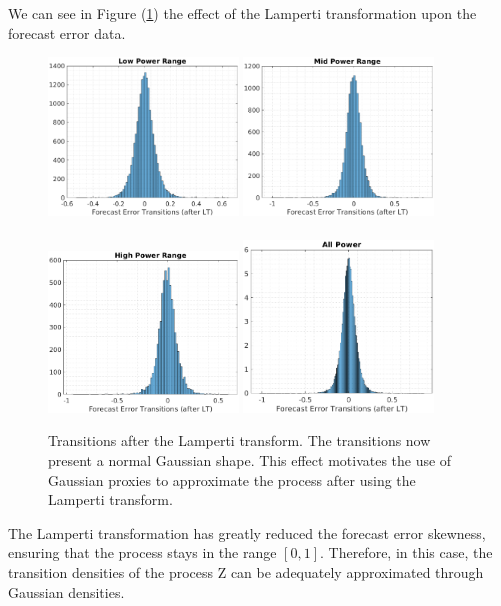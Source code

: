 \documentclass[11pt]{article}
\theoremstyle{definition}
\begin{document}
{\color{red} We can see in Figure (\ref{fig:LP_transitions}) the effect of the Lamperti transformation upon the forecast error data. 

\begin{figure}[H]
\centering
\includegraphics[width=0.45\textwidth]{plots/LP_t_LP.eps}
\includegraphics[width=0.45\textwidth]{plots/MP_t_LP.eps}\\
\quad\\
\includegraphics[width=0.45\textwidth]{plots/HP_t_LP.eps}
\includegraphics[width=0.45\textwidth]{plots/AP_t_LP.eps}
\caption{Transitions after the Lamperti transform. The transitions now present a normal Gaussian shape. This effect motivates the use of Gaussian proxies to approximate the process after using the Lamperti transform.}
  \label{fig:LP_transitions}
\end{figure}

The Lamperti transformation has greatly reduced the forecast error skewness, ensuring that the process stays in the range $[0,1]$. Therefore, in this case, the transition densities of the process Z can be adequately approximated through Gaussian densities.}
\end{document}
